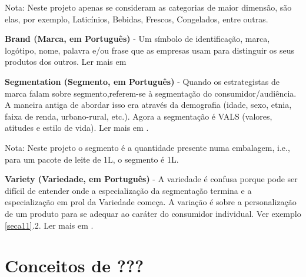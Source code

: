 {\footnotesize Nota: Neste projeto apenas se consideram as categorias de maior dimensão, são elas, por exemplo, Laticínios, Bebidas, Frescos, Congelados, entre outras.}

\vspace{0.2cm}
\textbf{Brand (Marca, em Português)} - Um símbolo de identificação, marca, logótipo, nome, palavra e/ou frase que as empresas usam para distinguir os seus produtos dos outros. Ler mais em \cite{investopedia:brandDefinition2018}

\vspace{0.2cm}
\textbf{Segmentation (Segmento, em Português)} - Quando os estrategistas de marca falam sobre segmento,referem-se à segmentação do consumidor/audiência. A maneira antiga de abordar isso era através da demografia (idade, sexo, etnia, faixa de renda, urbano-rural, etc.). Agora a segmentação é VALS (valores, atitudes e estilo de vida). Ler mais em \cite{sphereoi:itemIdentification2018}.

{\footnotesize Nota: Neste projeto o segmento é a quantidade presente numa embalagem, i.e., para um pacote de leite de 1L, o segmento é 1L.}


\vspace{0.2cm}
\textbf{Variety (Variedade, em Português)} - A variedade é confusa porque pode ser difícil de entender onde a especialização da segmentação termina e a especialização em prol da Variedade começa. A variação é sobre a personalização de um produto para se adequar ao caráter do consumidor individual. Ver exemplo \ref{seca11}.2. Ler mais em \cite{sphereoi:itemIdentification2018}.

\vspace{0.5cm}

\noindent{}

%
%
\section{Conceitos de ???} \label{seca12}	
	
\glsaddall
\printglossary[type=\acronymtype,title=Acrónimos]
